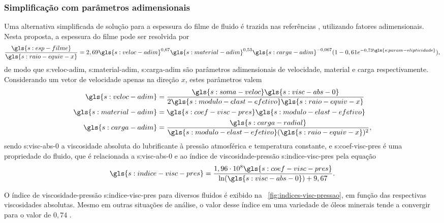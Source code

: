 \documentclass[12pt,oneside,english,brazil,lmodern,siglas,simbolos,cite=num]{ucsmonograph}
\begin{document}
	\subsubsection{Simplificação com parâmetros adimensionais} \label{sec:ehl:simpl}
	Uma alternativa simplificada de solução para a espessura do filme de fluido é trazida nas referências \cite{hamrock:1991,spikes:2006}, utilizando fatores adimensionais.
	Nesta proposta, a espessura do filme pode ser resolvida por
	\begin{equation} \label{eqn:ehl:esp-filme}
		\frac{\gls{s:esp-filme}}{\gls{s:raio-equiv-x}} = 
		2,69\gls{s:veloc-adim}^{0,67}\gls{s:material-adim}^{0,53}
		\gls{s:carga-adim}^{-0,067}
		(1-0,61e^{-0,73\gls{s:param-elipticidade}}),
	\end{equation}
	de modo que \gls{s:veloc-adim}, \gls{s:material-adim}, \gls{s:carga-adim} são parâmetros adimensionais de velocidade, material e carga respectivamente.
	Considerando um vetor de velocidade apenas na direção $x$, estes parâmetros valem \cite{hamrock:1991}
	\begin{align}
		\gls{s:veloc-adim} &= \frac{\gls{s:soma-veloc}\gls{s:visc-abs-0}}
		{2\gls{s:modulo-elast-efetivo}\gls{s:raio-equiv-x}}
		\label{eqn:ehl:veloc-adim}\\
		\gls{s:material-adim} &= \gls{s:coef-visc-pres}
		\gls{s:modulo-elast-efetivo} \label{eqn:ehl:material-adim}\\
		\gls{s:carga-adim} &= \frac{\gls{s:carga-radial}}
		{\gls{s:modulo-elast-efetivo}(\gls{s:raio-equiv-x})^2}
		\label{eqn:ehl:carga-adim},
	\end{align}
	sendo \gls{s:visc-abs-0} a viscosidade absoluta do lubrificante à pressão atmosférica e temperatura constante, e \gls{s:coef-visc-pres} é uma propriedade do fluido, que é relacionada a \gls{s:visc-abs-0} e ao índice de viscosidade-pressão \gls{s:indice-visc-pres} pela equação \cite{wijnant:1998}
	\begin{equation} \label{eqn:ehl:indice-visc-pressao}
		\gls{s:indice-visc-pres} = 
		\frac{1,96\cdot10^8\gls{s:coef-visc-pres}}
		{\ln(\gls{s:visc-abs-0})+9,67}.
	\end{equation}
	
	O índice de viscosidade-pressão \gls{s:indice-visc-pres} para diversos fluidos é exibido na \figurename\ \ref{fig:indices-visc-pressao}, em função das respectivas viscosidades absolutas.
	Mesmo em outras situações de análise, o valor desse índice em uma variedade de óleos minerais tende a convergir para o valor de $0,74$ \cite{roelands:1966}.
	
\end{document}

